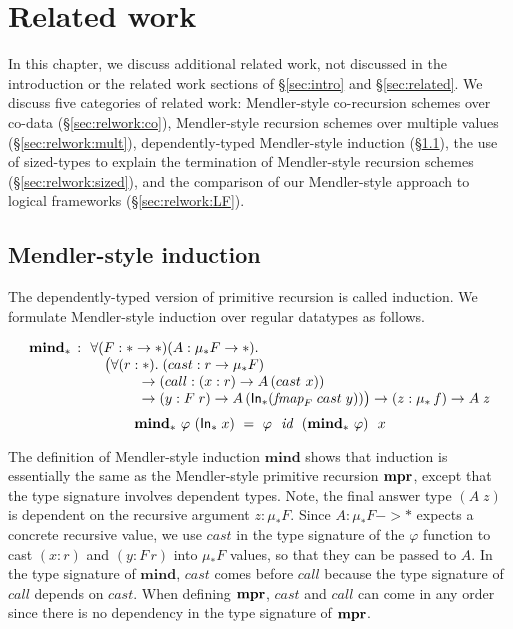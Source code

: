 \chapter{Related work}\label{ch:relwork}
In this chapter, we discuss additional related work,
not discussed in the introduction or the related work sections
of \S\ref{sec:intro} and  \S\ref{sec:related}.
We discuss five categories of related work:
Mendler-style co-recursion schemes over co-data (\S\ref{sec:relwork:co}),
Mendler-style recursion schemes over multiple values (\S\ref{sec:relwork:mult}),
dependently-typed Mendler-style induction (\S\ref{sec:relwork:dep}), 
the use of sized-types to explain the termination of Mendler-style
recursion schemes (\S\ref{sec:relwork:sized}), and the comparison of
our Mendler-style approach to logical frameworks (\S\ref{sec:relwork:LF}).




\section{Mendler-style induction}
\label{sec:relwork:dep}
The dependently-typed version of primitive recursion is called induction.
We formulate Mendler-style induction over regular datatypes as follows.
\vspace*{-2em}
\begin{singlespace}
\[\begin{array}{ll}
\textbf{mind}_{*} \, :
& \!\!\forall (F:* -> *) (A: \mu_{*}F -> *). \\
& ~~ \big(\forall(r:*).\;(cast : r -> \mu_{*}F) \\
& ~\qquad\quad -> (call : (x:r) -> A\,(cast~x)) \\
& ~\qquad\quad -> (y: F\;r) -> A\,(\mathsf{In}_{*}(\textit{fmap}_{F}\;cast\;y)) \big) 
-> (z:\mu_{*}\,f) -> A\;z
\end{array}
\]
\[
\textbf{mind}_{*} ~ \varphi ~ (\mathsf{In}_{*}\;x)
  ~=~ \varphi~~\textit{id}~~(\textbf{mind}_{*}~\varphi)~~x \]
\end{singlespace}\noindent
The definition of Mendler-style induction $\textbf{mind}$ shows that induction
is essentially the same as the Mendler-style primitive recursion $\mathbf{mpr}$,
except that the type signature involves dependent types.
Note, the final answer type $(A\;z)$ is dependent on
the recursive argument $z:\mu_{*}F$.
Since $A: \mu_{*}F -> *$ expects a concrete recursive value,
we use $cast$ in the type signature of the $\varphi$ function
to cast $(x:r)$ and $(y:F\,r)$ into $\mu_{*}F$ values, so that
they can be passed to $A$.
In the type signature of $\textbf{mind}$, $cast$ comes before $call$
because the type signature of $call$ depends on $cast$.
When defining $\mathbf{mpr}$, $cast$ and $call$ can come in any order
since there is no dependency in the type signature of $\mathbf{mpr}$.

